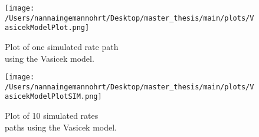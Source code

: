 \begin{figure}[h]
    \centering
    \begin{minipage}{0.5\textwidth}
        \texttt{[image: /Users/nannaingemannohrt/Desktop/master\_thesis/main/plots/VasicekModelPlot.png]}
        \caption{Plot of one simulated rate path \\ using the Vasicek model.}
        \label{fig:vasicek}
    \end{minipage}\hfill 
    \begin{minipage}{0.5\textwidth}
        \texttt{[image: /Users/nannaingemannohrt/Desktop/master\_thesis/main/plots/VasicekModelPlotSIM.png]}
        \caption{Plot of 10 simulated  rates \\ paths using the Vasicek model.}
        \label{fig:vasicek-sim}
    \end{minipage}
\end{figure}

